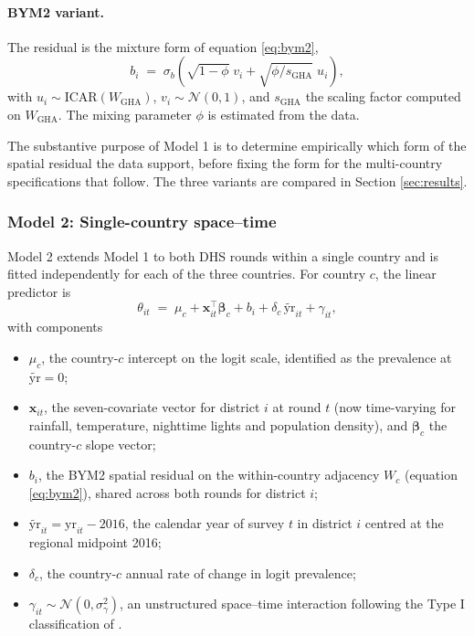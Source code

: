 \documentclass{article}
\begin{document}
\paragraph{BYM2 variant.}

The residual is the mixture form of equation \ref{eq:bym2},
\begin{equation}
b_i \;=\; \sigma_b \left( \sqrt{1 - \phi} \; v_i + \sqrt{\phi / s_{\text{GHA}}} \; u_i \right),
\label{eq:m1-bym2}
\end{equation} with \(u_i \sim \mathrm{ICAR}(W_{\text{GHA}})\),
\(v_i \sim \mathcal{N}(0, 1)\), and \(s_{\text{GHA}}\) the scaling
factor computed on \(W_{\text{GHA}}\). The mixing parameter \(\phi\) is
estimated from the data.

The substantive purpose of Model 1 is to determine empirically which
form of the spatial residual the data support, before fixing the form
for the multi-country specifications that follow. The three variants are
compared in Section \ref{sec:results}.

\subsubsection{Model 2: Single-country
space--time}\label{model-2-single-country-spacetime}

\label{sec:m2}

Model 2 extends Model 1 to both DHS rounds within a single country and
is fitted independently for each of the three countries. For country
\(c\), the linear predictor is \begin{equation}
\theta_{it} \;=\; \mu_c + \mathbf{x}_{it}^{\top} \bm{\beta}_c + b_i + \delta_c \, \widetilde{\text{yr}}_{it} + \gamma_{it},
\label{eq:m2}
\end{equation} with components

\begin{itemize}
\item $\mu_c$, the country-$c$ intercept on the logit scale, identified as the prevalence at $\widetilde{\text{yr}} = 0$;
\item $\mathbf{x}_{it}$, the seven-covariate vector for district $i$ at round $t$ (now time-varying for rainfall, temperature, nighttime lights and population density), and $\bm{\beta}_c$ the country-$c$ slope vector;
\item $b_i$, the BYM2 spatial residual on the within-country adjacency $W_c$ (equation \ref{eq:bym2}), shared across both rounds for district $i$;
\item $\widetilde{\text{yr}}_{it} = \text{yr}_{it} - 2016$, the calendar year of survey $t$ in district $i$ centred at the regional midpoint 2016;
\item $\delta_c$, the country-$c$ annual rate of change in logit prevalence;
\item $\gamma_{it} \sim \mathcal{N}(0, \sigma_\gamma^{2})$, an unstructured space–time interaction following the Type I classification of \citep{knorrheld2000}.
\end{itemize}
\end{document}
